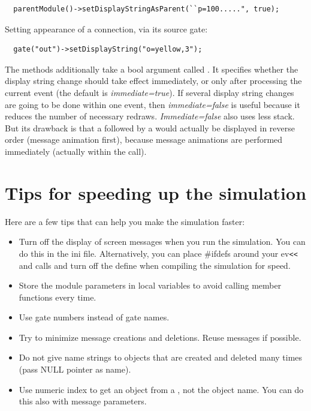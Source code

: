 \begin{Verbatim}
  parentModule()->setDisplayStringAsParent(``p=100.....", true);
\end{Verbatim}

Setting appearance of a connection, via its source gate:

\begin{Verbatim}
  gate("out")->setDisplayString("o=yellow,3");
\end{Verbatim}

The  methods additionally take a bool
argument called . It specifies whether the display
string change should take effect immediately, or only after processing
the current event (the default is \textit{immediate=true}). If several
display string changes are going to be done within one event, then
\textit{immediate=false} is useful because it reduces the number of
necessary redraws. \textit{Immediate=false} also uses less stack.  But
its drawback is that a  followed by a
 would actually be displayed in reverse order (message
animation first), because message animations are performed immediately
(actually within the  call).





\section{Tips for speeding up the simulation}

Here are a few tips that can help you make the simulation faster:
\begin{itemize}
\item{Turn off the display of screen messages when you run the
    simulation.  You can do this in the ini file. Alternatively, you
    can place \#ifdefs around your ev\texttt{<}\texttt{<} and
     calls and turn off the define when compiling
    the simulation for speed.}
  \item{Store the module parameters in local variables to avoid
    calling  member functions every time.}
  \item{Use gate numbers instead of gate names.}
  \item{Try to minimize message creations and deletions. Reuse
    messages if possible.}
  \item{Do not give name strings to objects that are created and
    deleted many times (pass NULL pointer as name).}
  \item{Use numeric index to get an object from a , not the
    object name. You can do this also with message parameters.}
\end{itemize}


